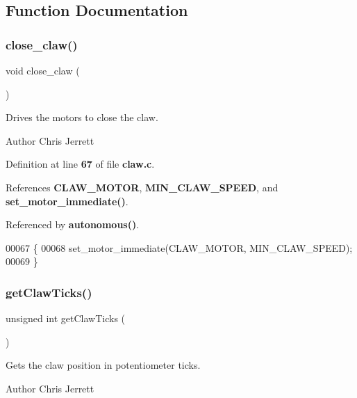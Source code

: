 \subsection{Function Documentation}
\mbox{\label{claw_8c_ac42dd40dbb37219295286859c6b068c2}} 
\subsubsection{close\+\_\+claw()}
{\footnotesize\ttfamily void close\+\_\+claw (\begin{DoxyParamCaption}{ }\end{DoxyParamCaption})}



Drives the motors to close the claw. 

\begin{DoxyAuthor}{Author}
Chris Jerrett 
\end{DoxyAuthor}


Definition at line \textbf{ 67} of file \textbf{ claw.\+c}.



References \textbf{ C\+L\+A\+W\+\_\+\+M\+O\+T\+OR}, \textbf{ M\+I\+N\+\_\+\+C\+L\+A\+W\+\_\+\+S\+P\+E\+ED}, and \textbf{ set\+\_\+motor\+\_\+immediate()}.



Referenced by \textbf{ autonomous()}.


\begin{DoxyCode}
00067                   \{
00068   set_motor_immediate(CLAW_MOTOR, MIN_CLAW_SPEED);
00069 \}
\end{DoxyCode}
\mbox{\label{claw_8c_addd2004effae7c94400aed1fe6a90ead}} 
\subsubsection{get\+Claw\+Ticks()}
{\footnotesize\ttfamily unsigned int get\+Claw\+Ticks (\begin{DoxyParamCaption}{ }\end{DoxyParamCaption})}



Gets the claw position in potentiometer ticks. 

\begin{DoxyAuthor}{Author}
Chris Jerrett 
\end{DoxyAuthor}


